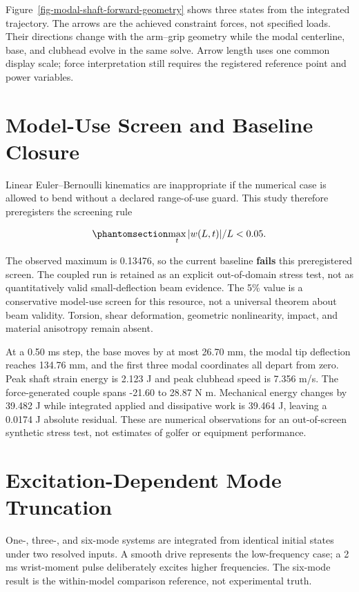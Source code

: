 \documentclass[
  letterpaper,
]{report}
\begin{document}
Figure~\ref{fig-modal-shaft-forward-geometry} shows three states from
the integrated trajectory. The arrows are the achieved constraint
forces, not specified loads. Their directions change with the arm--grip
geometry while the modal centerline, base, and clubhead evolve in the
same solve. Arrow length uses one common display scale; force
interpretation still requires the registered reference point and power
variables.

\section{Model-Use Screen and Baseline
Closure}\label{model-use-screen-and-baseline-closure}

Linear Euler--Bernoulli kinematics are inappropriate if the numerical
case is allowed to bend without a declared range-of-use guard. This
study therefore preregisters the screening rule

\begin{equation}\phantomsection\label{eq-modal-shaft-deflection-screen}{
\max_t |w(L,t)|/L < 0.05.
}\end{equation}

The observed maximum is 0.13476, so the current baseline \textbf{fails}
this preregistered screen. The coupled run is retained as an explicit
out-of-domain stress test, not as quantitatively valid small-deflection
beam evidence. The 5\% value is a conservative model-use screen for this
resource, not a universal theorem about beam validity. Torsion, shear
deformation, geometric nonlinearity, impact, and material anisotropy
remain absent.

At a 0.50 ms step, the base moves by at most 26.70 mm, the modal tip
deflection reaches 134.76 mm, and the first three modal coordinates all
depart from zero. Peak shaft strain energy is 2.123 J and peak clubhead
speed is 7.356 m/s. The force-generated couple spans -21.60 to 28.87 N
m. Mechanical energy changes by 39.482 J while integrated applied and
dissipative work is 39.464 J, leaving a 0.0174 J absolute residual.
These are numerical observations for an out-of-screen synthetic stress
test, not estimates of golfer or equipment performance.

\section{Excitation-Dependent Mode
Truncation}\label{excitation-dependent-mode-truncation}

One-, three-, and six-mode systems are integrated from identical initial
states under two resolved inputs. A smooth drive represents the
low-frequency case; a 2 ms wrist-moment pulse deliberately excites
higher frequencies. The six-mode result is the within-model comparison
reference, not experimental truth.
\end{document}
